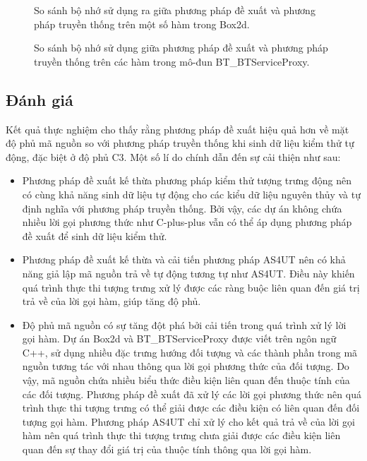 \begin{figure}[H]
    \centering
    
    \caption{So sánh bộ nhớ sử dụng ra giữa phương pháp đề xuất và phương pháp truyền thống trên một số hàm trong Box2d.}
    \label{fig:mem-box2d}
\end{figure}

\begin{figure}[H]
    \centering
    
    \caption{So sánh bộ nhớ sử dụng giữa phương pháp đề xuất và phương pháp truyền thống trên các hàm trong mô-đun BT\_BTServiceProxy.}
    \label{fig:mem-serviceproxy}
\end{figure}

\subsection{Đánh giá}
Kết quả thực nghiệm cho thấy rằng phương pháp đề xuất hiệu quả hơn về mặt độ phủ mã nguồn so với phương pháp truyền thống khi sinh dữ liệu kiểm thử tự động, đặc biệt ở độ phủ C3. Một số lí do chính dẫn đến sự cải thiện như sau:
\begin{itemize}
    \item Phương pháp đề xuất kế thừa phương pháp kiểm thử tượng trưng động nên có cùng khả năng sinh dữ liệu tự động cho các kiểu dữ liệu nguyên thủy và tự định nghĩa với phương pháp truyền thống. Bởi vậy, các dự án không chứa nhiều lời gọi phương thức như C-plus-plus vẫn có thể áp dụng phương pháp đề xuất để sinh dữ liệu kiểm thử.
  
    \item Phương pháp đề xuất kế thừa và cải tiến phương pháp AS4UT nên có khả năng giả lập mã nguồn trả về tự động tương tự như AS4UT. Điều này khiến quá trình thực thi tượng trưng xử lý được các ràng buộc liên quan đến giá trị trả về của lời gọi hàm, giúp tăng độ phủ.
    
    \item Độ phủ mã nguồn có sự tăng đột phá bởi cải tiến trong quá trình xử lý lời gọi hàm. Dự án Box2d và BT\_BTServiceProxy được viết trên ngôn ngữ C++, sử dụng nhiều đặc trưng hướng đối tượng và các thành phần trong mã nguồn tương tác với nhau thông qua lời gọi phương thức của đối tượng. Do vậy, mã nguồn chứa nhiều biểu thức điều kiện liên quan đến thuộc tính của các đối tượng. Phương pháp đề xuất đã xử lý các lời gọi phương thức nên quá trình thực thi tượng trưng có thể giải được các điều kiện có liên quan đến đối tượng gọi hàm. Phương pháp AS4UT chỉ xử lý cho kết quả trả về của lời gọi hàm nên quá trình thực thi tượng trưng chưa giải được các điều kiện liên quan đến sự thay đổi giá trị của thuộc tính thông qua lời gọi hàm.
\end{itemize}

